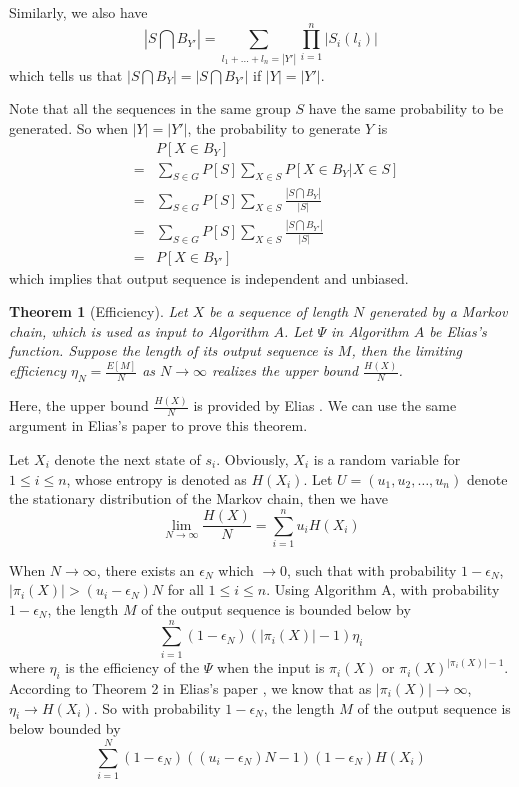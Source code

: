\documentclass[journal]{IEEEtran}
\newtheorem{Theorem}{Theorem}
\begin{document}
Similarly, we also have
$$|S\bigcap B_{Y'}|=\sum_{l_1+...+l_n=|Y'|}\prod_{i=1}^n|S_i(l_i)|$$
which tells us that $|S\bigcap B_Y|=|S\bigcap B_{Y'}|$ if $|Y|=|Y'|$.

Note that all the sequences in the same group $S$ have the same probability to be generated. So when $|Y|=|Y'|$, the
probability to generate $Y$ is
\begin{eqnarray*}
&& P[X\in B_Y]\\
&=&\sum_{S\in G} P[S] \sum_{X\in S}P[X\in B_Y|X\in S]\\
&=&\sum_{S\in G} P[S] \sum_{X\in S}\frac{|S\bigcap B_Y|}{|S|}\\
&=&\sum_{S\in G} P[S] \sum_{X\in S}\frac{|S\bigcap B_{Y'}|}{|S|}\\
&=& P[X\in B_{Y'}]
\end{eqnarray*}
which implies that output sequence is independent and unbiased.
\hfill\QED


\begin{Theorem}[Efficiency]
Let $X$ be a sequence of length $N$ generated by a Markov chain, which is used as input to Algorithm $A$. Let $\Psi$ in Algorithm $A$ be Elias's function.
Suppose the length of its output sequence is $M$, then the limiting efficiency $
\eta_N=\frac{E[M]}{N}$ as ${N\rightarrow\infty}$ realizes the upper bound $\frac{H(X)}{N}$.
\label{theorem_efficiencyA}
\end{Theorem}


\proof Here, the upper bound $\frac{H(X)}{N}$ is provided by Elias \cite{Elias1972}. We can use the same argument in Elias's paper \cite{Elias1972} to prove this theorem.

Let $X_i$ denote the next state of $s_i$. Obviously, $X_i$ is a random variable for $1\leq i\leq n$, whose
entropy is denoted as $H(X_i)$.  Let $U= (u_1,u_2, \ldots, u_n)$ denote the stationary distribution of the Markov chain, then
we have
$$\lim_{N\rightarrow \infty}\frac{H(X)}{N}=\sum_{i=1}^n u_i H(X_i)$$

When $N\rightarrow \infty$, there exists an $\epsilon_N$ which $\rightarrow 0$, such that
with probability $1-\epsilon_N$, $|\pi_i(X)|>(u_i-\epsilon_N)N$ for all $1\leq i\leq n$. Using Algorithm A, with probability $1-\epsilon_N$, the length $M$ of the output sequence is bounded below by
$$\sum_{i=1}^n (1-\epsilon_N)(|\pi_i(X)|-1)\eta_i$$
where $\eta_i$ is the efficiency of the $\Psi$ when the input is $\pi_i(X)$ or $\pi_i(X)^{|\pi_i(X)|-1}$.
According to Theorem 2 in Elias's paper \cite{Elias1972}, we know that as $|\pi_i(X)|\rightarrow \infty$, $\eta_i\rightarrow H(X_i)$.
So with probability $1-\epsilon_N$, the length $M$ of the output sequence  is below bounded by
$$\sum_{i=1}^N (1-\epsilon_N)((u_i-\epsilon_N)N-1)(1-\epsilon_N) H(X_i)$$
\end{document}

